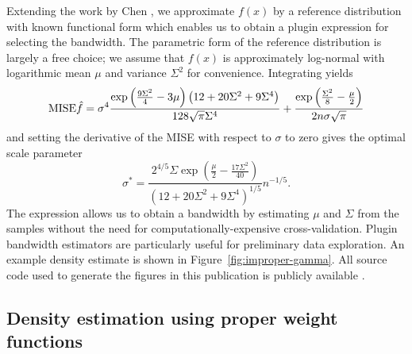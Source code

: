 Extending the work by Chen \cite{Chen2000}, we approximate $f\left(x\right)$ by a reference distribution with known functional form which enables us to obtain a plugin expression for selecting the bandwidth. The parametric form of the reference distribution is largely a free choice; we assume that $f(x)$ is approximately log-normal with logarithmic mean $\mu$ and variance $\Sigma^{2}$ for convenience. Integrating yields 
\begin{equation}
\mathrm{MISE}\hat{f}=\sigma^{4}\frac{\exp\left(\frac{9\Sigma^{2}}{4}-3\mu\right)\left(12+20\Sigma^{2}+9\Sigma^{4}\right)}{128\sqrt{\pi}\Sigma^{4}}+\frac{\exp\left(\frac{\Sigma^{2}}{8}-\frac{\mu}{2}\right)}{2n\sigma\sqrt{\pi}}\label{eq:chen-lognormal-mise}
\end{equation}
and setting the derivative of the MISE with respect to $\sigma$ to zero gives the optimal scale parameter 
\begin{equation}
\sigma^{*}=\frac{2^{4/5}\Sigma\exp\left(\frac{\mu}{2}-\frac{17\Sigma^{2}}{40}\right)}{\left(12+20\Sigma^{2}+9\Sigma^{4}\right)^{1/5}}n^{-1/5}.\label{eq:chen-plugin}
\end{equation}
The expression allows us to obtain a bandwidth by estimating $\mu$ and $\Sigma$ from the samples without the need for computationally-expensive cross-validation. Plugin bandwidth estimators are particularly useful for preliminary data exploration. An example density estimate is shown in Figure~\ref{fig:improper-gamma}. All source code used to generate the figures in this publication is publicly available \cite{SourceCode}.


\subsection{Density estimation using proper weight functions}

